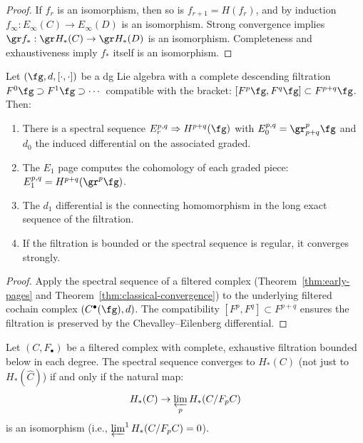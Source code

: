 \begin{proof}
If $f_r$ is an isomorphism, then so is $f_{r+1} = H(f_r)$, and by induction 
$f_\infty: E_\infty(C) \to E_\infty(D)$ is an isomorphism. Strong convergence 
implies $\gr f_*: \gr H_*(C) \to \gr H_*(D)$ is an isomorphism. Completeness 
and exhaustiveness imply $f_*$ itself is an isomorphism.
\end{proof}

\begin{theorem}
\label{thm:spectral-sequence-filtered-dg}
Let $(\fg, d, [\cdot,\cdot])$ be a dg Lie algebra with a
complete descending filtration $F^0\fg \supset F^1\fg \supset \cdots$
compatible with the bracket:
$[F^p\fg, F^q\fg] \subset F^{p+q}\fg$.  Then:
\begin{enumerate}[label=\textup{(\roman*)}]
\item There is a spectral sequence $E_r^{p,q} \Rightarrow H^{p+q}(\fg)$
  with $E_0^{p,q} = \gr^p_{p+q}\fg$ and $d_0$ the induced differential on
  the associated graded.
\item The $E_1$ page computes the cohomology of each graded piece:
  $E_1^{p,q} = H^{p+q}(\gr^p\fg)$.
\item The $d_1$ differential is the connecting homomorphism
  in the long exact sequence of the filtration.
\item If the filtration is bounded or the spectral sequence is
  regular, it converges strongly.
\end{enumerate}
\end{theorem}

\begin{proof}
Apply the spectral sequence of a filtered complex
(Theorem~\ref{thm:early-pages} and
Theorem~\ref{thm:classical-convergence}) to the underlying
filtered cochain complex $(C^\bullet(\fg), d)$.
The compatibility $[F^p, F^q] \subset F^{p+q}$ ensures the
filtration is preserved by the Chevalley--Eilenberg
differential.
\end{proof}

\begin{proposition}
\label{prop:complete-filt-convergence}
Let $(C, F_\bullet)$ be a filtered complex with complete, exhaustive filtration 
bounded below in each degree. The spectral sequence converges to $H_*(C)$ 
(not just to $H_*(\widehat{C})$) if and only if the natural map:
\[
H_*(C) \to \varprojlim_p H_*(C / F_p C)
\]
is an isomorphism (i.e., $\varprojlim^1 H_*(C / F_p C) = 0$).
\end{proposition}


